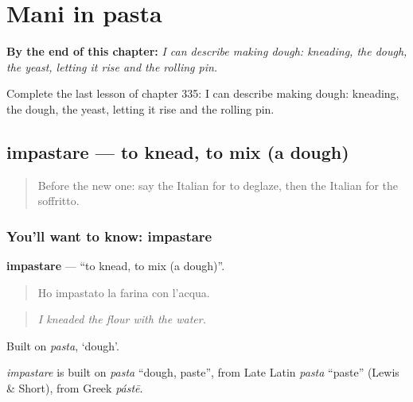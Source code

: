 
\chapter{Mani in pasta}
\label{ch:it-mani-in-pasta}

\begin{chapteropening}
\textbf{By the end of this chapter:} \emph{I can describe making dough: kneading, the dough, the yeast, letting it rise and the rolling pin.}

Complete the last lesson of chapter 335: I can describe making dough: kneading, the dough, the yeast, letting it rise and the rolling pin.
\end{chapteropening}

\section[impastare]{impastare — to knead, to mix (a dough)}

\label{lesson:IT-C335-impastare}



\begin{quote}
Before the new one: say the Italian for to deglaze, then the Italian for the soffritto.
\end{quote}

\subsection*{You'll want to know: impastare}
\textbf{impastare} — \textquotedblleft{}to knead, to mix (a dough)\textquotedblright{}.

\begin{quote}
Ho impastato la farina con l'acqua.
\end{quote}

\begin{quote}
\emph{I kneaded the flour with the water.}
\end{quote}

Built on \emph{pasta}, ‘dough’.

\begin{cousinweb}
\emph{impastare} is built on \emph{pasta} \textquotedblleft{}dough, paste\textquotedblright{}, from Late Latin \emph{pasta} \textquotedblleft{}paste\textquotedblright{} (Lewis \& Short), from Greek \emph{pástē}.
\end{cousinweb}


